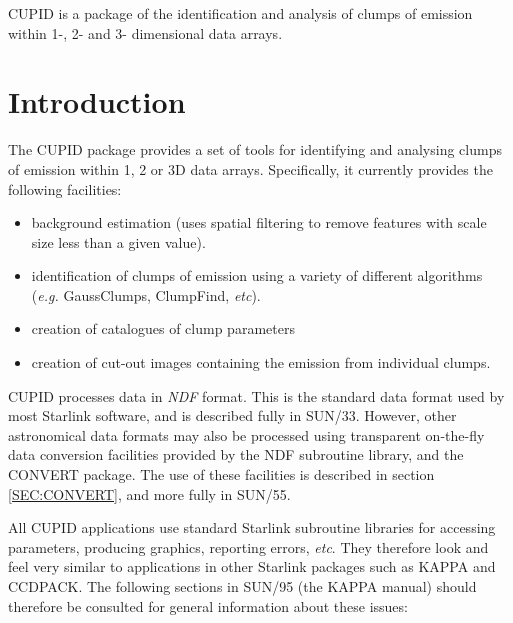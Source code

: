 \documentclass[twoside,11pt]{article}
\newcommand{\stardocinitials}  {SUN}
\newcommand{\stardocnumber}    {255.1}
\newcommand{\stardocabstract}  {CUPID is a package of the identification
and analysis of clumps of emission within 1-, 2- and 3- dimensional
data arrays.}
\newcommand{\stardocname}{\stardocinitials /\stardocnumber}
\newcommand{\hyperref}[4]{#2\ref{#4}#3}
\newenvironment{latexonly}{}{}
\newcommand{\xref}[3]{#1}
\newcommand{\xlabel}[1]{}
\renewcommand{\_}{\texttt{\symbol{95}}}
\renewcommand{\thepage}{\roman{page}}
\begin{document}
\stardocabstract

  \newpage
  \begin{latexonly}
    \setlength{\parskip}{0mm}
    \tableofcontents
    \setlength{\parskip}{\medskipamount}
    \markboth{\stardocname}{\stardocname}
  \end{latexonly}
\cleardoublepage
\renewcommand{\thepage}{\arabic{page}}
\setcounter{page}{1}

\section{\xlabel{introduction}Introduction}

The CUPID package provides a set of tools for identifying and analysing
clumps of emission within 1, 2 or 3D data arrays. Specifically, it currently
provides the following facilities:

\begin{itemize}
\item background estimation (uses spatial filtering to remove features with
      scale size less than a given value).
\item identification of clumps of emission using a variety of different
      algorithms (\emph{e.g.} GaussClumps, ClumpFind, \emph{etc}).
\item creation of catalogues of clump parameters
\item creation of cut-out images containing the emission from individual clumps.
\end{itemize}

CUPID processes data in \emph{NDF} format. This is the standard data
format used by most Starlink software, and is described fully in
\xref{SUN/33}{sun33}{}. However, other astronomical data formats may also
be processed using transparent on-the-fly data conversion facilities
provided by the NDF subroutine library, and the CONVERT package. The use of
these facilities is described \hyperref{here}{in section }{}{SEC:CONVERT},
and more fully in \xref{SUN/55}{sun55}{}.

All CUPID applications use standard Starlink subroutine libraries for
accessing parameters, producing graphics, reporting errors, \emph{etc}. They
therefore look and feel very similar to applications in other Starlink
packages such as KAPPA and CCDPACK. The following sections in
\xref{SUN/95}{sun95}{} (the KAPPA manual) should therefore be consulted for
general information about these issues:
\end{document}

